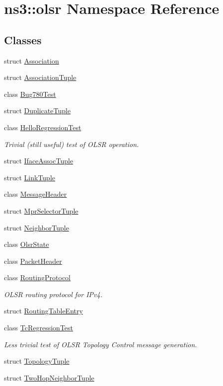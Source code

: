 \hypertarget{namespacens3_1_1olsr}{}\section{ns3\+:\+:olsr Namespace Reference}
\label{namespacens3_1_1olsr}
\subsection*{Classes}
\begin{DoxyCompactItemize}
\item 
struct \hyperlink{structns3_1_1olsr_1_1Association}{Association}
\item 
struct \hyperlink{structns3_1_1olsr_1_1AssociationTuple}{Association\+Tuple}
\item 
class \hyperlink{classns3_1_1olsr_1_1Bug780Test}{Bug780\+Test}
\item 
struct \hyperlink{structns3_1_1olsr_1_1DuplicateTuple}{Duplicate\+Tuple}
\item 
class \hyperlink{classns3_1_1olsr_1_1HelloRegressionTest}{Hello\+Regression\+Test}
\begin{DoxyCompactList}\small\item\em Trivial (still useful) test of O\+L\+SR operation. \end{DoxyCompactList}\item 
struct \hyperlink{structns3_1_1olsr_1_1IfaceAssocTuple}{Iface\+Assoc\+Tuple}
\item 
struct \hyperlink{structns3_1_1olsr_1_1LinkTuple}{Link\+Tuple}
\item 
class \hyperlink{classns3_1_1olsr_1_1MessageHeader}{Message\+Header}
\item 
struct \hyperlink{structns3_1_1olsr_1_1MprSelectorTuple}{Mpr\+Selector\+Tuple}
\item 
struct \hyperlink{structns3_1_1olsr_1_1NeighborTuple}{Neighbor\+Tuple}
\item 
class \hyperlink{classns3_1_1olsr_1_1OlsrState}{Olsr\+State}
\item 
class \hyperlink{classns3_1_1olsr_1_1PacketHeader}{Packet\+Header}
\item 
class \hyperlink{classns3_1_1olsr_1_1RoutingProtocol}{Routing\+Protocol}
\begin{DoxyCompactList}\small\item\em O\+L\+SR routing protocol for I\+Pv4. \end{DoxyCompactList}\item 
struct \hyperlink{structns3_1_1olsr_1_1RoutingTableEntry}{Routing\+Table\+Entry}
\item 
class \hyperlink{classns3_1_1olsr_1_1TcRegressionTest}{Tc\+Regression\+Test}
\begin{DoxyCompactList}\small\item\em Less trivial test of O\+L\+SR Topology Control message generation. \end{DoxyCompactList}\item 
struct \hyperlink{structns3_1_1olsr_1_1TopologyTuple}{Topology\+Tuple}
\item 
struct \hyperlink{structns3_1_1olsr_1_1TwoHopNeighborTuple}{Two\+Hop\+Neighbor\+Tuple}
\end{DoxyCompactItemize}

